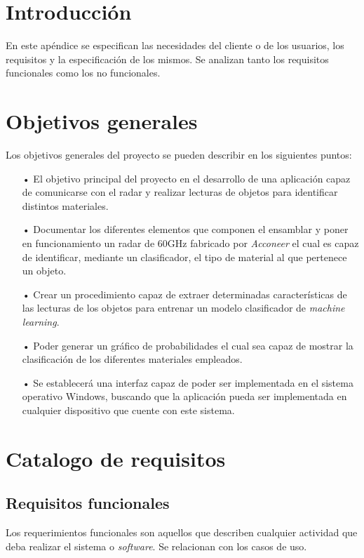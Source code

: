 
\section{Introducción}

En este apéndice se especifican las necesidades del cliente o de los usuarios, los requisitos y la especificación de los mismos. Se analizan tanto los requisitos funcionales como los no funcionales.

\section{Objetivos generales}

Los objetivos generales del proyecto se pueden describir en los siguientes puntos:
\begin{itemize}
\item[•] El objetivo principal del proyecto en el desarrollo de una aplicación capaz de comunicarse con el radar y realizar lecturas de objetos para identificar distintos materiales.

\item[•] Documentar los diferentes elementos que componen el ensamblar y poner en funcionamiento un radar de 60GHz fabricado por \textit{Acconeer} el cual es capaz de identificar, mediante un clasificador, el tipo de material al que pertenece un objeto.

\item[•] Crear un procedimiento capaz de extraer determinadas características de las lecturas de los objetos para entrenar un modelo clasificador de \textit{machine learning}.

\item[•] Poder generar un gráfico de probabilidades el cual sea capaz de mostrar la clasificación de los diferentes materiales empleados.

\item[•]Se establecerá una interfaz capaz de poder ser implementada en el sistema operativo Windows, buscando que la aplicación pueda ser implementada en cualquier dispositivo que cuente con este sistema.
\end{itemize}

\section{Catalogo de requisitos}
\subsection{Requisitos funcionales}
Los requerimientos funcionales son aquellos que describen cualquier actividad que deba realizar el sistema o \textit{software}. Se relacionan con los casos de uso.

